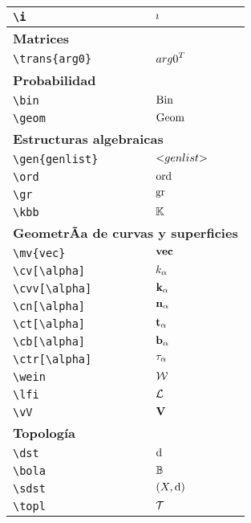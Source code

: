 \begin{longtable}{|p{3.5cm}|p{2cm}|}
\verb|\i| & $\displaystyle\i$ \\ \midrule 
\bottomrule \multicolumn{2}{|p{5.5cm}|}{\textbf{Matrices}} \\ \toprule 
\verb|\trans{arg0}| & $\displaystyle\trans{arg0}$ \\ \midrule 
\bottomrule \multicolumn{2}{|p{5.5cm}|}{\textbf{Probabilidad}} \\ \toprule 
\verb|\bin| & $\displaystyle\bin$ \\ \midrule 
\verb|\geom| & $\displaystyle\geom$ \\ \midrule 
\bottomrule \multicolumn{2}{|p{5.5cm}|}{\textbf{Estructuras algebraicas}} \\ \toprule 
\verb|\gen{genlist}| & $\displaystyle\gen{genlist}$ \\ \midrule 
\verb|\ord| & $\displaystyle\ord$ \\ \midrule 
\verb|\gr| & $\displaystyle\gr$ \\ \midrule 
\verb|\kbb| & $\displaystyle\kbb$ \\ \midrule 
\bottomrule \multicolumn{2}{|p{5.5cm}|}{\textbf{GeometrÃ­a de curvas y superficies}} \\ \toprule 
\verb|\mv{vec}| & $\displaystyle\mv{vec}$ \\ \midrule 
\verb|\cv[\alpha]| & $\displaystyle\cv[\alpha]$ \\ \midrule 
\verb|\cvv[\alpha]| & $\displaystyle\cvv[\alpha]$ \\ \midrule 
\verb|\cn[\alpha]| & $\displaystyle\cn[\alpha]$ \\ \midrule 
\verb|\ct[\alpha]| & $\displaystyle\ct[\alpha]$ \\ \midrule 
\verb|\cb[\alpha]| & $\displaystyle\cb[\alpha]$ \\ \midrule 
\verb|\ctr[\alpha]| & $\displaystyle\ctr[\alpha]$ \\ \midrule 
\verb|\wein| & $\displaystyle\wein$ \\ \midrule 
\verb|\lfi| & $\displaystyle\lfi$ \\ \midrule 
\verb|\vV| & $\displaystyle\vV$ \\ \midrule 
\bottomrule \multicolumn{2}{|p{5.5cm}|}{\textbf{Topología}} \\ \toprule 
\verb|\dst| & $\displaystyle\dst$ \\ \midrule 
\verb|\bola| & $\displaystyle\bola$ \\ \midrule 
\verb|\sdst| & $\displaystyle\sdst$ \\ \midrule 
\verb|\topl| & $\displaystyle\topl$ \\ \midrule 

\end{longtable}
